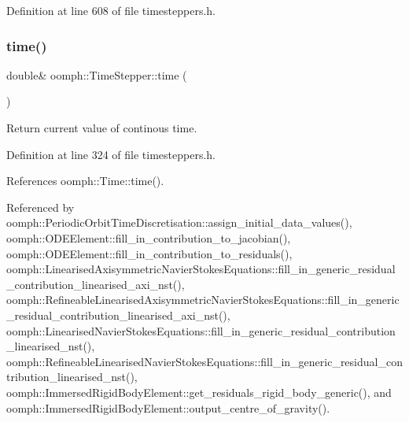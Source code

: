 Definition at line 608 of file timesteppers.\+h.

\mbox{\label{classoomph_1_1TimeStepper_ab902086340e6b33c5114db30c1f644c1}} 
\subsubsection{\texorpdfstring{time()}{time()}\hspace{0.1cm}{\footnotesize\ttfamily [1/2]}}
{\footnotesize\ttfamily double\& oomph\+::\+Time\+Stepper\+::time (\begin{DoxyParamCaption}{ }\end{DoxyParamCaption})\hspace{0.3cm}{\ttfamily [inline]}}



Return current value of continous time. 



Definition at line 324 of file timesteppers.\+h.



References oomph\+::\+Time\+::time().



Referenced by oomph\+::\+Periodic\+Orbit\+Time\+Discretisation\+::assign\+\_\+initial\+\_\+data\+\_\+values(), oomph\+::\+O\+D\+E\+Element\+::fill\+\_\+in\+\_\+contribution\+\_\+to\+\_\+jacobian(), oomph\+::\+O\+D\+E\+Element\+::fill\+\_\+in\+\_\+contribution\+\_\+to\+\_\+residuals(), oomph\+::\+Linearised\+Axisymmetric\+Navier\+Stokes\+Equations\+::fill\+\_\+in\+\_\+generic\+\_\+residual\+\_\+contribution\+\_\+linearised\+\_\+axi\+\_\+nst(), oomph\+::\+Refineable\+Linearised\+Axisymmetric\+Navier\+Stokes\+Equations\+::fill\+\_\+in\+\_\+generic\+\_\+residual\+\_\+contribution\+\_\+linearised\+\_\+axi\+\_\+nst(), oomph\+::\+Linearised\+Navier\+Stokes\+Equations\+::fill\+\_\+in\+\_\+generic\+\_\+residual\+\_\+contribution\+\_\+linearised\+\_\+nst(), oomph\+::\+Refineable\+Linearised\+Navier\+Stokes\+Equations\+::fill\+\_\+in\+\_\+generic\+\_\+residual\+\_\+contribution\+\_\+linearised\+\_\+nst(), oomph\+::\+Immersed\+Rigid\+Body\+Element\+::get\+\_\+residuals\+\_\+rigid\+\_\+body\+\_\+generic(), and oomph\+::\+Immersed\+Rigid\+Body\+Element\+::output\+\_\+centre\+\_\+of\+\_\+gravity().

\mbox{\label{classoomph_1_1TimeStepper_ab0fe7c6da82843fbaf406a29f5aaa78b}} 
